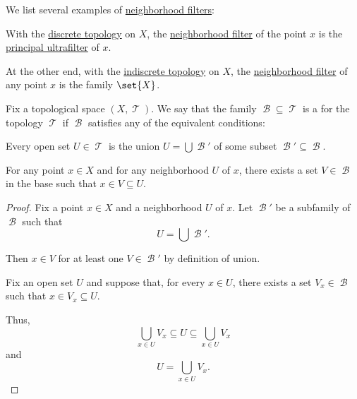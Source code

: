 \begin{example}\label{ex:def:topological_neighborhood}
  We list several examples of \hyperref[def:topological_neighborhood]{neighborhood filters}:
  \begin{thmenum}
     With the \hyperref[def:discrete_topology]{discrete topology} on \( X \), the \hyperref[def:topological_neighborhood]{neighborhood filter} of the point \( x \) is the \hyperref[def:principal_ultrafilter]{principal ultrafilter} of \( x \).

     At the other end, with the \hyperref[def:indiscrete_topology]{indiscrete topology} on \( X \), the \hyperref[def:topological_neighborhood]{neighborhood filter} of any point \( x \) is the family \( \set{ X } \).
  \end{thmenum}
\end{example}

\begin{definition}\label{def:topological_base}
  Fix a topological space \( (X, \mscrT) \). We say that the family \( \mscrB \subseteq \mscrT \) is a  for the topology \( \mscrT \) if \( \mscrB \) satisfies any of the equivalent conditions:
  \begin{thmenum}
     Every open set \( U \in \mscrT \) is the union \( U = \bigcup \mscrB' \) of some subset \( \mscrB' \subseteq \mscrB \).

    \medskip

     For any point \( x \in X \) and for any neighborhood \( U \) of \( x \), there exists a set \( V \in \mscrB \) in the base such that \( x \in V \subseteq U \).
  \end{thmenum}
\end{definition}
\begin{proof}
   Fix a point \( x \in X \) and a neighborhood \( U \) of \( x \). Let \( \mscrB' \) be a subfamily of \( \mscrB \) such that
  \begin{equation*}
    U = \bigcup \mscrB'.
  \end{equation*}

  Then \( x \in V \) for at least one \( V \in \mscrB' \) by definition of union.

   Fix an open set \( U \) and suppose that, for every \( x \in U \), there exists a set \( V_x \in \mscrB \) such that \( x \in V_x \subseteq U \).

  Thus,
  \begin{equation*}
    \bigcup_{x \in U} V_x \subseteq U \subseteq \bigcup_{x \in U} V_x
  \end{equation*}
  and
  \begin{equation*}
    U = \bigcup_{x \in U} V_x.
  \end{equation*}
\end{proof}

